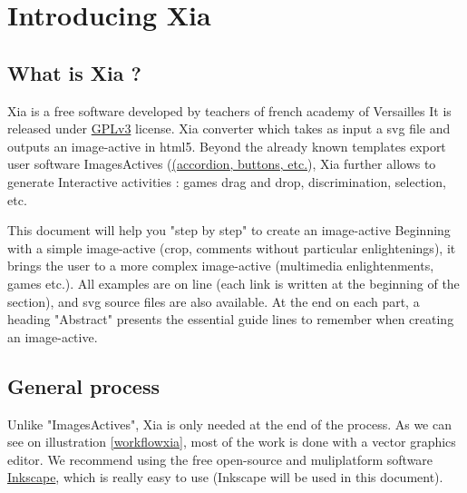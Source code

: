


 \maketitle
 \tableofcontents
 
 
\section{Introducing Xia}

\subsection{What is Xia ?}

Xia is a free software developed by teachers of french academy of Versailles
It is released under \href{http://www.gnu.org/copyleft/gpl.html}{GPLv3} license.
Xia converter which takes as input a svg file and outputs an image-active in 
html5. Beyond the already known templates export user software ImagesActives 
(\href{http://images-actives.crdp-versailles.fr/spip.php?article11\&lang=fr}
{(accordion, buttons, etc.}), Xia further allows to generate
Interactive activities : games drag and drop, discrimination, selection, etc.

This document will help you "step by step" to create an image-active
Beginning with a simple image-active (crop, comments without particular 
enlightenings), it brings the user to a more complex image-active (multimedia
 enlightenments, games etc.). All examples are on line (each link is written at 
the beginning of the section), and svg source files are also available. At the end
on each part, a heading "Abstract" presents the essential guide lines to 
remember when creating an image-active.

\subsection{General process}

Unlike "ImagesActives", Xia is only needed at the end of the process.
As we can see on illustration \ref{workflowxia}, most of the work is done with 
a  vector graphics editor. We recommend using the free open-source and 
muliplatform software \href{http://www.inkscape.org/}{Inkscape}, which is 
really easy to use (Inkscape will be used in this document).


